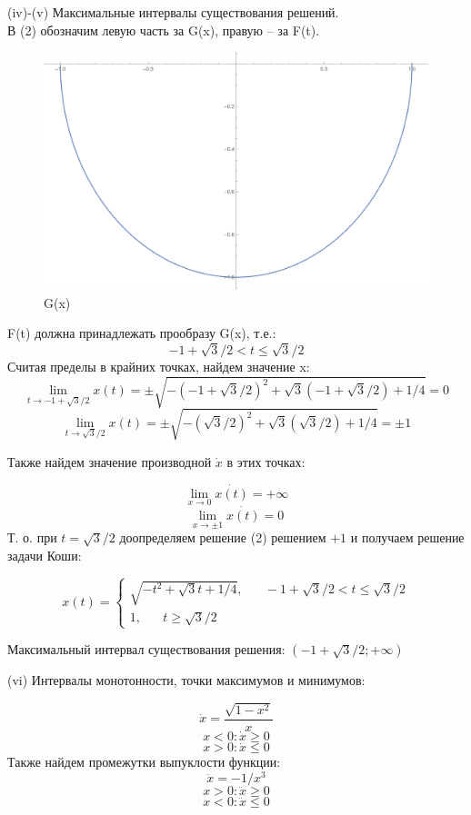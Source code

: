 \documentclass[a4paper, 12pt]{article}
\begin{document}
(iv)-(v) Максимальные интервалы существования решений.\\
В (2) обозначим левую часть за G(x), правую -- за F(t).
 
\begin{figure}[H]
	\centering
	\includegraphics[scale=0.6]{1}
	\caption{G(x)}
\end{figure}
F(t) должна принадлежать прообразу G(x), т.е.:
\[-1+\sqrt{3}/2 < t \leq \sqrt{3}/2 \]
Считая пределы в крайних точках, найдем значение x:
\[\lim_{t \rightarrow -1+\sqrt{3}/2} x(t) = \pm \sqrt{-(-1+\sqrt{3}/2)^2+\sqrt{3}(-1+\sqrt{3}/2)+1/4} = 0\]
\[\lim_{t  \rightarrow \sqrt{3}/2} x(t) = \pm \sqrt{-(\sqrt{3}/2)^2+\sqrt{3}(\sqrt{3}/2)+1/4} = \pm 1\]

Также найдем значение производной $\dot{x}$ в этих точках:

\[\lim_{x  \rightarrow 0}\dot{x(t)} = +\infty\]
\[\lim_{x  \rightarrow \pm 1 }\dot{x(t)} = 0\]
Т. о. при $t = \sqrt{3}/2$  доопределяем решение (2) решением $+1$ и получаем решение задачи Коши:

\begin{equation*}
x(t) = 
 \begin{cases}
   \sqrt{-t^2+\sqrt{3}t+1/4}, \;\;\;\;\;\;  -1+\sqrt{3}/2 < t\leq \sqrt{3}/2\\
   1, \;\;\;\;\;\; t\geq \sqrt{3}/2
 \end{cases}
\end{equation*}



Максимальный интервал существования решения: $(-1+ \sqrt{3}/2; +\infty)$

(vi) Интервалы монотонности, точки максимумов и минимумов:

\[\dot{x}=\frac{\sqrt{1-x^2}}{x}\]
\[ x < 0: \dot{x}  \geq 0\]
\[x > 0: \dot{x} \leq 0\]
Также найдем промежутки выпуклости функции:
\[ \ddot{x} = -1/x^3\]
\[ x > 0: \ddot{x} \geq 0\]
\[x < 0: \ddot{x} \leq 0\]
\end{document}
